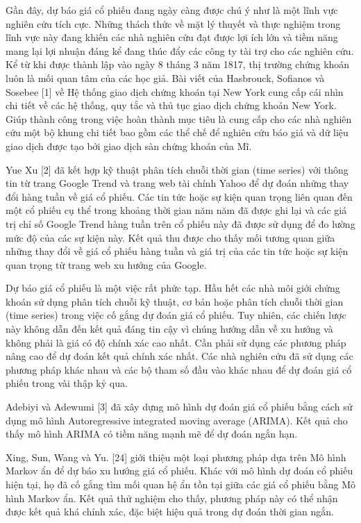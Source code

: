 Gần đây, dự báo giá cổ phiếu đang ngày càng được chú ý như là một lĩnh vực nghiên cứu tích cực. Những thách thức về mặt lý thuyết và thực nghiệm trong lĩnh vực này đang khiến các nhà nghiên cứu đạt được lợi ích lớn và tiềm năng mang lại lợi nhuận đáng kể đang thúc đẩy các công ty tài trợ cho các nghiên cứu. Kể từ khi được thành lập vào ngày 8 tháng 3 năm 1817, thị trường chứng khoán luôn là mối quan tâm của các học giả. Bài viết của Hasbrouck, Sofianos và Sosebee [1] về Hệ thống giao dịch chứng khoán tại New York cung cấp cái nhìn chi tiết về các hệ thống, quy tắc và thủ tục giao dịch chứng khoán New York. Giúp thành công trong việc hoàn thành mục tiêu là cung cấp cho các nhà nghiên cứu một bộ khung chi tiết bao gồm các thể chế để nghiên cứu báo giá và dữ liệu giao dịch được tạo bởi giao dịch sàn chứng khoán của Mĩ.

Yue Xu [2] đã kết hợp kỹ thuật phân tích chuỗi thời gian (time series) với thông tin từ trang Google Trend và trang web tài chính Yahoo để dự đoán những thay đổi hàng tuần về giá cổ phiếu. Các tin tức hoặc sự kiện quan trọng liên quan đến một cổ phiếu cụ thể trong khoảng thời gian năm năm đã được ghi lại và các giá trị chỉ số Google Trend hàng tuần trên cổ phiếu này đã được sử dụng để đo lường mức độ của các sự kiện này. Kết quả thu được cho thấy mối tương quan giữa những thay đổi về giá cổ phiếu hàng tuần và giá trị của các tin tức hoặc sự kiện quan trọng từ trang web xu hướng của Google.

Dự báo giá cổ phiếu là một việc rất phức tạp. Hầu hết các nhà môi giới chứng khoán sử dụng phân tích chuỗi kỹ thuật, cơ bản hoặc phân tích chuỗi thời gian (time series) trong việc cố gắng dự đoán giá cổ phiếu. Tuy nhiên, các chiến lược này không dẫn đến kết quả đáng tin cậy vì chúng hướng dẫn về xu hướng và không phải là giá có độ chính xác cao nhất. Cần phải sử dụng các phương pháp nâng cao để dự đoán kết quả chính xác nhất. Các nhà nghiên cứu đã sử dụng các phương pháp khác nhau và các bộ tham số đầu vào khác nhau để dự đoán giá cổ phiếu trong vài thập kỷ qua.

Adebiyi và Adewumi [3] đã xây dựng mô hình dự đoán giá cổ phiếu bằng cách sử dụng mô hình Autoregressive integrated moving average (ARIMA). Kết quả cho thấy mô hình ARIMA có tiềm năng mạnh mẽ để dự đoán ngắn hạn.

Xing, Sun, Wang và Yu. [24] giới thiệu một loại phương pháp dựa trên Mô hình Markov ẩn để dự báo xu hướng giá cổ phiếu. Khác với mô hình dự đoán cổ phiếu hiện tại, họ đã cố gắng tìm mối quan hệ ẩn tồn tại giữa các giá cổ phiếu bằng Mô hình Markov ẩn. Kết quả thử nghiệm cho thấy, phương pháp này có thể nhận được kết quả khá chính xác, đặc biệt hiệu quả trong dự đoán thời gian ngắn.

